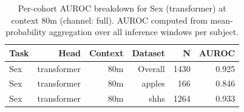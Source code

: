 \begin{table}[ht]
\centering
\caption{Per-cohort AUROC breakdown for Sex (transformer) at context 80m (channel: full). AUROC computed from mean-probability aggregation over all inference windows per subject.}
\label{tab:cohort_sex_binary_transformer_full}
\begin{tabular}{lrrrrr}
\toprule
Task & Head & Context & Dataset & N & AUROC \\
\midrule
Sex & transformer & 80m & Overall & 1430 & 0.925 \\
Sex & transformer & 80m & apples & 166 & 0.846 \\
Sex & transformer & 80m & shhs & 1264 & 0.933 \\
\bottomrule
\end{tabular}
\end{table}